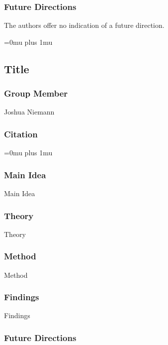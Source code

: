 \subsubsection{Future Directions}

\noindent
The authors offer no indication of a future direction. 

\Urlmuskip=0mu plus 1mu\relax

\noindent
\subsection{Title}

\subsubsection{Group Member}

\noindent
Joshua Niemann

\noindent
\subsubsection{Citation}

\Urlmuskip=0mu plus 1mu\relax

\subsubsection{Main Idea}

\noindent
Main Idea

\subsubsection{Theory}

\noindent
Theory

\subsubsection{Method}

\noindent
Method

\subsubsection{Findings}

\noindent
Findings

\subsubsection{Future Directions}

